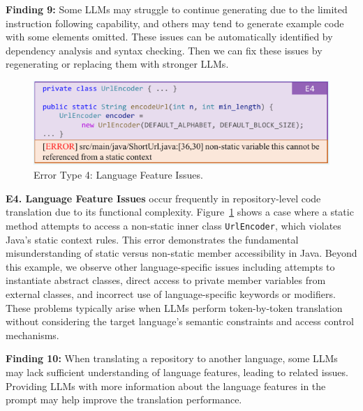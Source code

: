 \secmargin
\begin{myboxc} \textbf{Finding 9: } %
Some LLMs may struggle to continue generating due to the limited instruction following capability, and others may tend to generate example code with some elements omitted. These issues can be automatically identified by dependency analysis and syntax checking. Then we can fix these issues by regenerating or replacing them with stronger LLMs.
\end{myboxc} %
\secmargin


\begin{figure}
    \centering
    \includegraphics[width=\linewidth]{figures/E4.pdf}
    \figmargin
    \caption{Error Type 4: Language Feature Issues.}
    \label{fig:ErrorType4}
\end{figure}


\textbf{E4. Language Feature Issues} occur frequently in repository-level code translation due to its functional complexity. 
Figure~\ref{fig:ErrorType4} shows a case where a static method attempts to access a non-static inner class \texttt{UrlEncoder}, which violates Java's static context rules. This error demonstrates the fundamental misunderstanding of static versus non-static member accessibility in Java.
Beyond this example, we observe other language-specific issues including attempts to instantiate abstract classes, direct access to private member variables from external classes, and incorrect use of language-specific keywords or modifiers. These problems typically arise when LLMs perform token-by-token translation without considering the target language's semantic constraints and access control mechanisms.

\secmargin
\begin{myboxc} \textbf{Finding 10: } %
When translating a repository to another language, some LLMs may lack sufficient understanding of language features, leading to related issues. Providing LLMs with more information about the language features in the prompt may help improve the translation performance.
\end{myboxc} %
\secmargin


